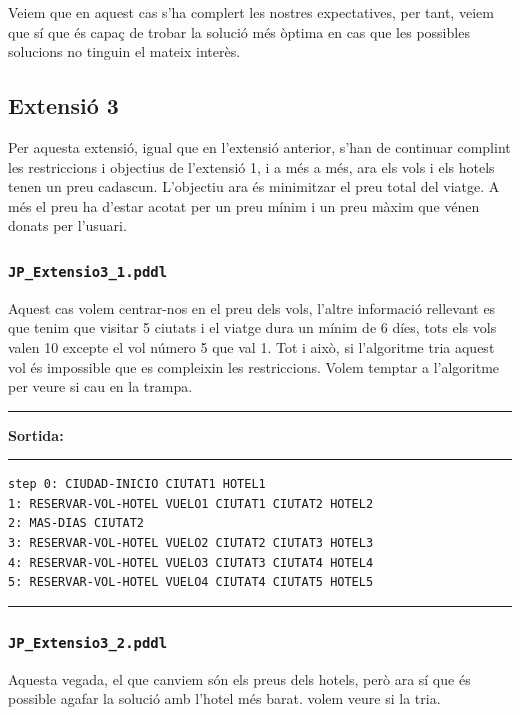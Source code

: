 \documentclass[11pt,a4paper]{article}
\begin{document}
Veiem que en aquest cas s'ha complert les nostres expectatives, per tant, veiem que sí que és capaç de trobar la solució més òptima en cas que les possibles solucions no tinguin el mateix interès.


\subsection{Extensió 3}

Per aquesta extensió, igual que en l'extensió anterior, s'han de continuar complint les restriccions i objectius de l'extensió 1, i a més a més, ara els vols i els hotels tenen un preu cadascun.
L'objectiu ara és minimitzar el preu total del viatge. A més el preu ha d'estar acotat per un preu mínim i un preu màxim que vénen donats per l'usuari.

\subsubsection*{\texttt{JP\_Extensio3\_1.pddl}}

Aquest cas volem centrar-nos en el preu dels vols, l'altre informació rellevant es que tenim que visitar 5 ciutats i el viatge dura un mínim de 6 díes, tots els vols valen 10 excepte el vol número 5 que val 1. Tot i això, si l'algoritme tria aquest vol és impossible que es compleixin les restriccions. Volem temptar a l'algoritme per veure si cau en la trampa.

\begin{samepage}
\medskip
\noindent
\rule{0.1\textwidth}{0.5mm}
\textbf{Sortida:}
\rule{0.76\textwidth}{0.5mm}
\begin{verbatim}
step 0: CIUDAD-INICIO CIUTAT1 HOTEL1
1: RESERVAR-VOL-HOTEL VUELO1 CIUTAT1 CIUTAT2 HOTEL2
2: MAS-DIAS CIUTAT2
3: RESERVAR-VOL-HOTEL VUELO2 CIUTAT2 CIUTAT3 HOTEL3
4: RESERVAR-VOL-HOTEL VUELO3 CIUTAT3 CIUTAT4 HOTEL4
5: RESERVAR-VOL-HOTEL VUELO4 CIUTAT4 CIUTAT5 HOTEL5
\end{verbatim}
\rule{\textwidth}{0.5mm}
\medskip
\end{samepage}

\subsubsection*{\texttt{JP\_Extensio3\_2.pddl}}

Aquesta vegada, el que canviem són els preus dels hotels, però ara sí que és possible agafar la solució amb l'hotel més barat. volem veure si la tria.
\end{document}
